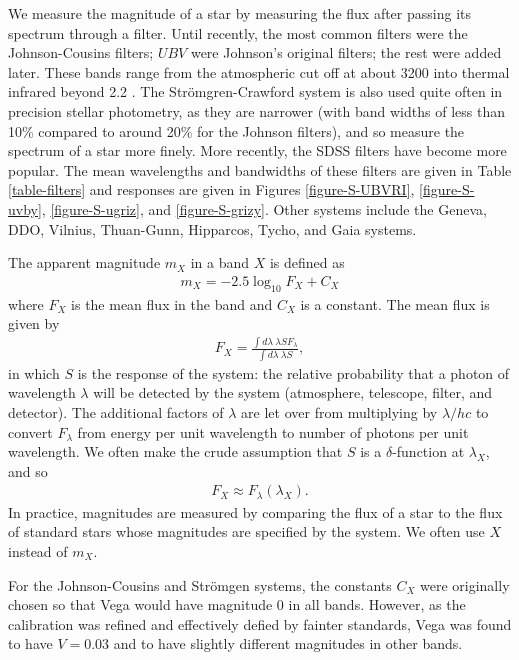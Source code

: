 We measure the magnitude of a star by measuring the flux
after passing its spectrum through a filter. Until recently, the most common
filters were the Johnson-Cousins filters; $UBV$ were
Johnson's original filters; the rest were added later. These
bands range from the atmospheric cut off at about 3200 {\Angstrom}
into thermal infrared beyond 2.2 {\micron}. The Strömgren-Crawford system is also used quite often in precision
stellar photometry, as they are narrower (with band widths
of less than 10\% compared to around 20\% for the Johnson
filters), and so measure the spectrum of a star more finely. More recently, the SDSS filters have become more popular.
The mean wavelengths and bandwidths of these filters are
given in Table \ref{table-filters} and responses are given in Figures \ref{figure-S-UBVRI}, \ref{figure-S-uvby}, \ref{figure-S-ugriz}, and \ref{figure-S-grizy}. Other systems include the
Geneva, DDO, Vilnius, Thuan-Gunn, Hipparcos, Tycho, and Gaia systems.

\newslide

The apparent magnitude $m_X$ in a band $X$ is defined as
\begin{align}
m_X = -2.5 \log_{10} F_X + C_X
\end{align}
where $F_X$ is the mean flux in the band and $C_X$ is a constant. 
The mean flux is given by
\begin{align}
F_X = \frac{\int\!d\lambda\:\lambda S F_\lambda}{\int\!d\lambda\:\lambda S},
\end{align}
in which $S$ is the response of the system: the relative probability that a photon of wavelength $\lambda$ will be detected by the system (atmosphere, telescope, filter, and detector). The additional factors of $\lambda$ are let over from multiplying by $\lambda/hc$ to convert $F_\lambda$ from energy per unit wavelength to number of photons per unit wavelength. We often make the crude assumption that $S$ is a $\delta$-function at $\lambda_X$, and so
\begin{align}
F_X \approx F_\lambda(\lambda_X).
\end{align}
In practice, magnitudes are measured by comparing the flux of a star
to the flux of standard stars whose magnitudes are specified by
the system. We often use $X$ instead of $m_X$.

\newslide

For the Johnson-Cousins and Strömgen systems, the constants $C_X$ were originally chosen so that Vega would have magnitude 0 in all bands. However, as the calibration was refined and effectively defied by fainter standards, Vega was found to have $V = 0.03$ and to have slightly different magnitudes in other bands.


